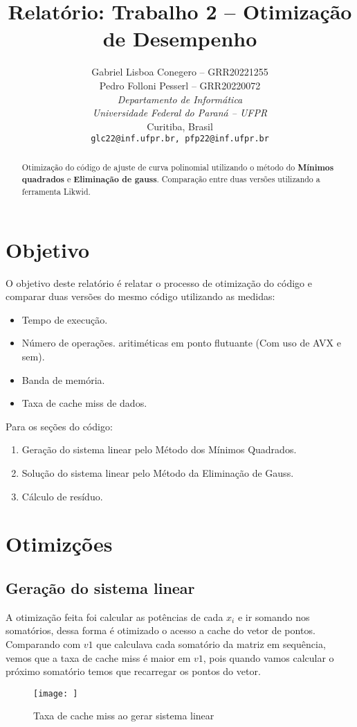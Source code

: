 \documentclass[a4paper, 11pt]{article}
\title{Relatório: Trabalho 2 -- Otimização de Desempenho}
\author{Gabriel Lisboa Conegero -- GRR20221255\\
Pedro Folloni Pesserl -- GRR20220072\\
\textit{Departamento de Informática}\\
\textit{Universidade Federal do Paraná -- UFPR}\\
Curitiba, Brasil\\
\texttt{glc22@inf.ufpr.br, pfp22@inf.ufpr.br}}
\date{}
\begin{document}
\maketitle

\begin{abstract}
    \begin{singlespace}
        Otimização do código de ajuste de curva polinomial utilizando o método do \textbf{Mínimos quadrados} e \textbf{Eliminação de gauss}. Comparação entre duas versões utilizando a ferramenta Likwid.
    \end{singlespace}
\end{abstract}

\section{Objetivo}
O objetivo deste relatório é relatar o processo de otimização do código e comparar duas versões do mesmo código utilizando as medidas:
\begin{itemize}
    \item Tempo de execução.
    \item Número de operações. aritiméticas em ponto flutuante (Com uso de AVX e sem).
    \item Banda de memória.
    \item Taxa de cache miss de dados.
\end{itemize}
Para os seções do código:
\begin{enumerate}
    \item Geração do sistema linear pelo Método dos Mínimos Quadrados.
    \item Solução do sistema linear pelo Método da Eliminação de Gauss.
    \item Cálculo de resíduo.
\end{enumerate}

\section{Otimizções}
\subsection{Geração do sistema linear}
A otimização feita foi calcular as potências de cada $x_i$ e ir somando nos somatórios, dessa forma é otimizado o acesso a cache do vetor de pontos. Comparando com $v1$ que calculava cada somatório da matriz em sequência, vemos que a taxa de cache miss é maior em $v1$, pois quando vamos calcular o próximo somatório temos que recarregar os pontos do vetor.
\begin{figure}
    \centering
    \texttt{[image: ]}
    \caption{Taxa de cache miss ao gerar sistema linear}
    \label{fig:gera_SL_L2_miss}
\end{figure}
\end{document}
